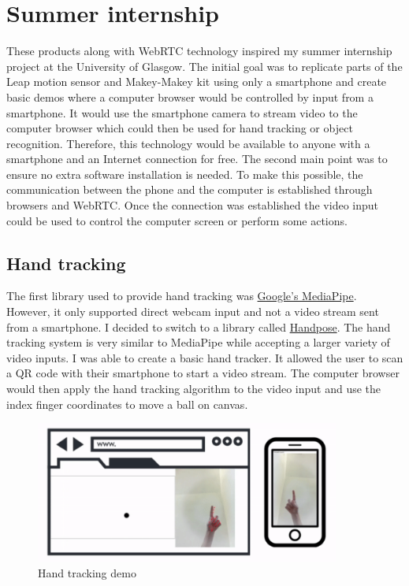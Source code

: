 \documentclass{l4proj}
\begin{document}
\section{Summer internship}
These products along with WebRTC technology inspired my summer internship project at the University of Glasgow. The initial goal was to replicate parts of the Leap motion sensor and Makey-Makey kit using only a smartphone and create basic demos where a computer browser would be controlled by input from a smartphone. It would use the smartphone camera to stream video to the computer browser which could then be used for hand tracking or object recognition. Therefore, this technology would be available to anyone with a smartphone and an Internet connection for free. The second main point was to ensure no extra software installation is needed. To make this possible, the communication between the phone and the computer is established through browsers and WebRTC. Once the connection was established the video input could be used to control the computer screen or perform some actions. 

\subsection{Hand tracking}
The first library used to provide hand tracking was \href{https://google.github.io/mediapipe/solutions/hands.html}{Google's MediaPipe}. However, it only supported direct webcam input and not a video stream sent from a smartphone. I decided to switch to a library called \href{https://github.com/tensorflow/tfjs-models/tree/master/handpose}{Handpose}. The hand tracking system is very similar to MediaPipe while accepting a larger variety of video inputs. I was able to create a basic hand tracker. It allowed the user to scan a QR code with their smartphone to start a video stream. The computer browser would then apply the hand tracking algorithm to the video input and use the index finger coordinates to move a ball on canvas. 

\begin{figure}[h!]
    \centering
    \includegraphics[width=10cm]{./images/hand.png}
    \caption{Hand tracking demo}
    \label{fig:hand}
\end{figure}
\end{document}
